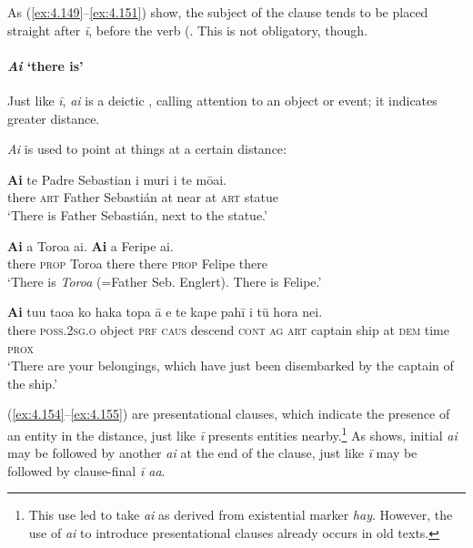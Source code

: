 As (\ref{ex:4.149}–\ref{ex:4.151}) show, the subject of the clause tends to be placed straight after \textit{{\ꞌ}ī}, before the verb (. This is not obligatory, though. 

\paragraph{\textit{{\ꞌ}Ai} ‘there is’}\label{sec:4.5.4.1.2}
Just like \textit{{\ꞌ}ī}, \textit{{\ꞌ}ai} is a deictic , calling attention to an object or event; it indicates greater distance.

\textit{{\ꞌ}Ai} is used to point at things at a certain distance:

\ea\label{ex:4.153}
\gll \textbf{{\ꞌ}Ai} te Padre Sebastian {\ꞌ}i muri i te mōai. \\
there \textsc{art} Father Sebastián at near at \textsc{art} statue \\

\glt 
‘There is Father Sebastián, next to the statue.’ \textstyleExampleref{[R412.180]} 
\z

\ea\label{ex:4.154}
\gll \textbf{{\ꞌ}Ai} a Toroa {\ꞌ}ai. \textbf{{\ꞌ}Ai} a Feripe {\ꞌ}ai.  \\
there \textsc{prop} Toroa there there \textsc{prop} Felipe there  \\

\glt 
‘There is \textit{Toroa} (=Father Seb. Englert). There is Felipe.’ \textstyleExampleref{[R411.134–135]}
\z

\ea\label{ex:4.155}
\gll \textbf{{\ꞌ}Ai} tu{\ꞌ}u tao{\ꞌ}a ko haka topa {\ꞌ}ā e te kape pahī {\ꞌ}i tū hora nei. \\
there \textsc{poss.2sg.o} object \textsc{prf} \textsc{caus} descend \textsc{cont} \textsc{ag} \textsc{art} captain ship at \textsc{dem} time \textsc{prox} \\

\glt
‘There are your belongings, which have just been disembarked by the captain of the ship.’ \textstyleExampleref{[R231.142]} 
\z

	(\ref{ex:4.154}–\ref{ex:4.155}) are presentational clauses, which indicate the presence of an entity in the distance, just like \textit{{\ꞌ}ī} presents entities nearby.\footnote{\label{fn:202}This use led \citet[319]{Fischer2001Hispan} to take \textit{{\ꞌ}ai} as derived from  existential marker \textit{hay}. However, the use of \textit{{\ꞌ}ai} to introduce presentational clauses already occurs in old texts.} As  shows, initial \textit{{\ꞌ}ai} may be followed by another \textit{{\ꞌ}ai} at the end of the clause, just like \textit{{\ꞌ}ī} may be followed by clause-final \textit{{\ꞌ}ī a{\ꞌ}a}.

